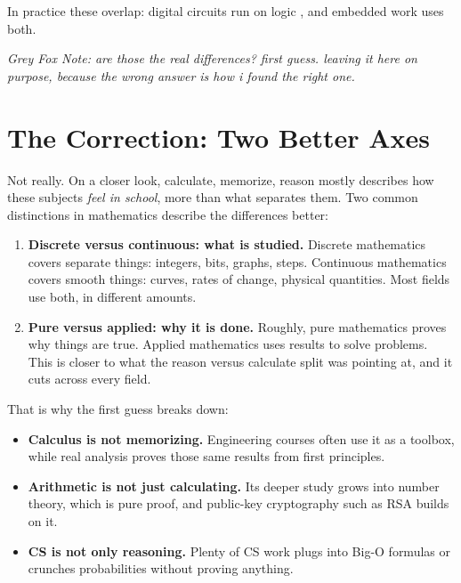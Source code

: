 \documentclass[11pt,a4paper]{article}
\newcommand{\gfnote}[1]{\par{\itshape Grey Fox Note: #1}\par}
\begin{document}
In practice these overlap: digital circuits run on logic \cite{shannon}, and embedded work uses both.

\gfnote{are those the real differences? first guess. leaving it here on purpose, because
the wrong answer is how i found the right one.}

\section{The Correction: Two Better Axes}

Not really. On a closer look, calculate, memorize, reason mostly describes how these subjects
\textit{feel in school}, more than what separates them. Two common distinctions in mathematics
describe the differences better:

\begin{enumerate}
  \item \textbf{Discrete versus continuous: what is studied.} Discrete mathematics covers separate
        things: integers, bits, graphs, steps. Continuous mathematics covers smooth things: curves,
        rates of change, physical quantities. Most fields use both, in different amounts.
  \item \textbf{Pure versus applied: why it is done.} Roughly, pure mathematics proves why things are
        true. Applied mathematics uses results to solve problems. This is closer to what the reason
        versus calculate split was pointing at, and it cuts across every field.
\end{enumerate}

That is why the first guess breaks down:

\begin{itemize}
  \item \textbf{Calculus is not memorizing.} Engineering courses often use it as a toolbox, while real
        analysis proves those same results from first principles. \cite{rudin}
  \item \textbf{Arithmetic is not just calculating.} Its deeper study grows into number theory, which is
        pure proof, and public-key cryptography such as RSA builds on it. \cite{rsa}
  \item \textbf{CS is not only reasoning.} Plenty of CS work plugs into Big-O formulas or crunches
        probabilities without proving anything.
\end{itemize}
\end{document}
